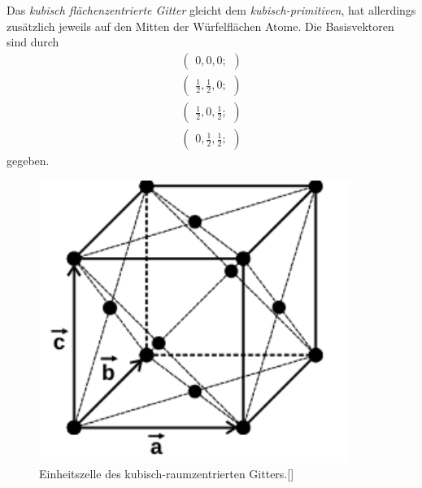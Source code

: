 Das \textit{kubisch flächenzentrierte Gitter} gleicht dem
\textit{kubisch-primitiven}, hat
allerdings zusätzlich jeweils auf den Mitten der Würfelflächen Atome.
Die Basisvektoren sind durch
\begin{align}
   \label{eqn:3*}
   \begin{pmatrix}
     0, 0, 0;
   \end{pmatrix}\\
   \begin{pmatrix}
     \frac{1}{2}, \frac{1}{2}, 0;
   \end{pmatrix}\\
   \begin{pmatrix}
     \frac{1}{2}, 0, \frac{1}{2};
     \end{pmatrix}\\
     \begin{pmatrix}
       0, \frac{1}{2}, \frac{1}{2};
     \end{pmatrix}
\end{align}
gegeben.

\begin{figure}[hhh]
  \centering
  \includegraphics[width=0.9\textwidth]{abbildungen/fcc.png}
  \caption{Einheitszelle des kubisch-raumzentrierten Gitters.[\cite{sample}]}
\end{figure}

